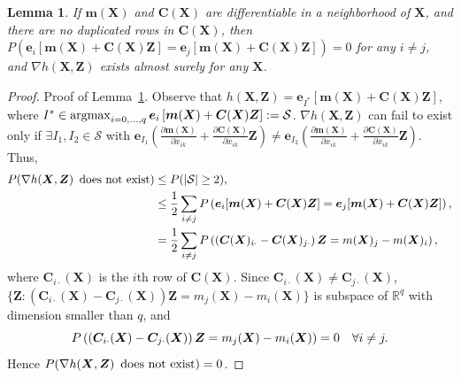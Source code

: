 \documentclass[paper=letter]{scrartcl}
\newcommand{\argmax}{\operatornamewithlimits{argmax}}
\newtheorem{lemma}{Lemma}
\begin{document}
\begin{lemma}
\label{lemma:2}
If $\bm{m}(\bm{X})$ and $\bm{C}(\bm{X})$ are 
differentiable in a neighborhood of $\bm{X}$, and there are no 
duplicated rows in $\bm{C}(\bm{X})$, 
then $P \left(\bm{e}_i [\bm{m}(\bm{X}) + \bm{C}(\bm{X}) \bm{Z}] = \bm{e}_j [\bm{m}(\bm{X}) + \bm{C}(\bm{X}) \bm{Z}]\right)=0$ for any $i \ne j$,
and $\nabla h(\bm{X}, \bm{Z})$ exists almost surely
for any $\bm{X}$.
\end{lemma}

\begin{proof}{Proof of Lemma~\ref{lemma:2}.} Observe that
$h(\bm{X}, \bm{Z}) = \bm{e}_{I^*} \left[ \bm{m}(\bm{X}) + \bm{C}(\bm{X}) \bm{Z} \right]$,
where $I^* \in \argmax_{i=0,\ldots,q} \bm{e}_i \left[ \bm{m}(\bm{X}) + \bm{C}(\bm{X}) \bm{Z} \right] := \mathcal{S}$. 
$\nabla h(\bm{X}, \bm{Z})$ can fail to exist only if $\exists I_1, I_2 \in \mathcal{S}$ with 
$\bm{e}_{I_1} (\frac{\partial \bm{m}(\bm{X})}{\partial x_{ik}} + 
\frac{\partial \bm{C}(\bm{X})}{\partial x_{ik}} \bm{Z}) \neq \bm{e}_{I_2} (\frac{\partial \bm{m}(\bm{X})}{\partial x_{ik}} + 
\frac{\partial \bm{C}(\bm{X})}{\partial x_{ik}} \bm{Z})$. Thus,
\begin{align*}
P(\nabla h(\bm{X}, \bm{Z}) \text{\, does not exist}) &\leq P ( \vert\mathcal{S}\vert \geq 2), \\
&\leq \frac{1}{2} \sum_{i \neq j} P \left(\bm{e}_i [\bm{m}(\bm{X}) + \bm{C}(\bm{X}) \bm{Z}] = \bm{e}_j [\bm{m}(\bm{X}) + \bm{C}(\bm{X}) \bm{Z}]\right),\\
&= \frac{1}{2}\sum_{i \neq j} P \left( \left(\bm{C}(\bm{X})_{i\cdot} - \bm{C}(\bm{X})_{j\cdot} \right) \bm{Z} = m(\bm{X})_j - m(\bm{X})_i \right),
\end{align*}
where $\bm{C}_{i\cdot}(\bm{X})$ is the $i$th row of $\bm{C}(\bm{X})$.
Since $\bm{C}_{i\cdot}(\bm{X}) \neq \bm{C}_{j\cdot}(\bm{X})$, $\{ \bm{Z}: \left(\bm{C}_{i\cdot}(\bm{X}) - \bm{C}_{j\cdot}(\bm{X}) \right) \bm{Z} = m_j(\bm{X}) - m_i(\bm{X}) \}$ 
is subspace of $\mathbb{R}^q$ with dimension smaller than $q$, and
\begin{equation*}
P \left( \left(\bm{C}_{i\cdot}(\bm{X}) - \bm{C}_{j\cdot}(\bm{X}) \right) \bm{Z} = m_j(\bm{X}) - m_i(\bm{X}) \right) = 0 \text{\quad} \forall i \neq j.
\end{equation*}
Hence
$P (\nabla h(\bm{X}, \bm{Z}) \text{\, does not exist}) = 0$.
\end{proof}
\end{document}
